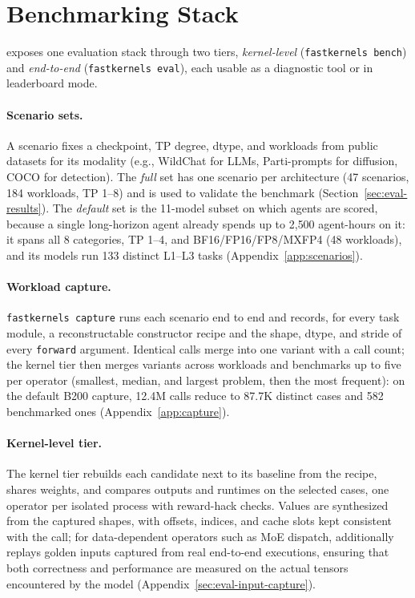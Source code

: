 \section{Benchmarking Stack}
\label{sec:benchmarking_tooling}

\fastkernels{} exposes one evaluation stack through two tiers, \emph{kernel-level} (\texttt{fastkernels bench}) and \emph{end-to-end} (\texttt{fastkernels eval}), each usable as a diagnostic tool or in leaderboard mode.

\paragraph{Scenario sets.}
A scenario fixes a checkpoint, TP degree, dtype, and workloads from public datasets for its modality (e.g., WildChat for LLMs, Parti-prompts for diffusion, COCO for detection).
The \emph{full} set has one scenario per architecture (47 scenarios, 184 workloads, TP 1--8) and is used to validate the benchmark (Section~\ref{sec:eval-results}).
The \emph{default} set is the 11-model subset on which agents are scored, because a single long-horizon agent already spends up to 2{,}500 agent-hours on it: it spans all 8 categories, TP 1--4, and BF16/FP16/FP8/MXFP4 (48 workloads), and its models run 133 distinct L1--L3 tasks (Appendix~\ref{app:scenarios}).

\paragraph{Workload capture.}
\texttt{fastkernels capture} runs each scenario end to end and records, for every task module, a reconstructable constructor recipe and the shape, dtype, and stride of every \texttt{forward} argument.
Identical calls merge into one variant with a call count; the kernel tier then merges variants across workloads and benchmarks up to five per operator (smallest, median, and largest problem, then the most frequent): on the default B200 capture, 12.4M calls reduce to 87.7K distinct cases and 582 benchmarked ones (Appendix~\ref{app:capture}).

\paragraph{Kernel-level tier.}
The kernel tier rebuilds each candidate next to its baseline from the recipe, shares weights, and compares outputs and runtimes on the selected cases, one operator per isolated process with reward-hack checks.
Values are synthesized from the captured shapes, with offsets, indices, and cache slots kept consistent with the call; for data-dependent operators such as MoE dispatch, \fastkernels{} additionally replays golden inputs captured from real end-to-end executions, ensuring that both correctness and performance are measured on the actual tensors encountered by the model (Appendix~\ref{sec:eval-input-capture}).

